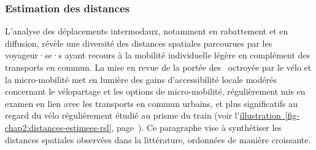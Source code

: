 \begin{refsegment}
\subsubsection*{Estimation des distances
    \label{chap2:estimation-distances}
    }
    
L'analyse des déplacements intermodaux, notamment en rabattement et en diffusion, révèle une diversité des distances spatiales parcourues par les voyageur·se·s ayant recours à la mobilité individuelle légère en complément des transports en commun. La mise en revue de la portée des ~octroyée par le vélo et la micro-mobilité met en lumière des gains d'accessibilité locale modérés concernant le vélopartage et les options de micro-mobilité, régulièrement mis en examen en lien avec les transports en commun urbains, et plus significatifs au regard du vélo régulièrement étudié au prisme du train (voir l'\hyperref[fig-chap2:distances-estimees-rsl]{illustration~\ref{fig-chap2:distances-estimees-rsl}}, page~\pageref{fig-chap2:distances-estimees-rsl}). Ce paragraphe vise à synthétiser les distances spatiales observées dans la littérature, ordonnées de manière croissante.%


\end{refsegment}
